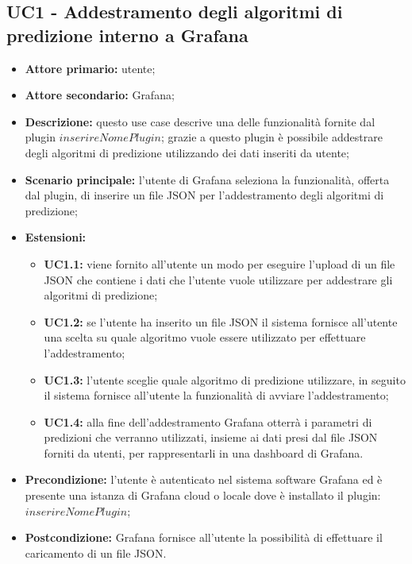 \documentclass{article}
\begin{document}
	\subsection{UC1 - Addestramento degli algoritmi di predizione interno a Grafana}
	\begin{itemize}
		\item \textbf{Attore primario:} utente;
		\item \textbf{Attore secondario:} Grafana;
		\item \textbf{Descrizione:} questo use case descrive una delle funzionalità fornite dal plugin $inserireNomePlugin$; grazie a questo plugin è possibile addestrare degli algoritmi di predizione utilizzando dei dati inseriti da utente;
		\item \textbf{Scenario principale:} l'utente di Grafana seleziona la funzionalità, offerta dal plugin, di inserire un file JSON per l'addestramento degli algoritmi di predizione;
		\item \textbf{Estensioni:}
			\begin{itemize}
				\item \textbf{UC1.1:} viene fornito all'utente un modo per eseguire l'upload di un file JSON che contiene i dati che l'utente vuole utilizzare per addestrare gli algoritmi di predizione;
				\item \textbf{UC1.2:} se l'utente ha inserito un file JSON il sistema fornisce all'utente una scelta su quale algoritmo vuole essere utilizzato per effettuare l'addestramento;
				\item \textbf{UC1.3:} l'utente sceglie quale algoritmo di predizione utilizzare, in seguito il sistema fornisce all'utente la funzionalità di avviare l'addestramento;
				\item \textbf{UC1.4:} alla fine dell'addestramento Grafana otterrà i parametri di predizioni che verranno utilizzati, insieme ai dati presi dal file JSON forniti da utenti, per rappresentarli in una dashboard di Grafana.
			\end{itemize}
		\item \textbf{Precondizione:} l'utente è autenticato nel sistema software Grafana ed è presente una istanza di Grafana cloud o locale dove è installato il plugin: $inserireNomePlugin$;
		\item \textbf{Postcondizione:} Grafana fornisce all'utente la possibilità di effettuare il caricamento di un file JSON.
	\end{itemize}
\end{document}
